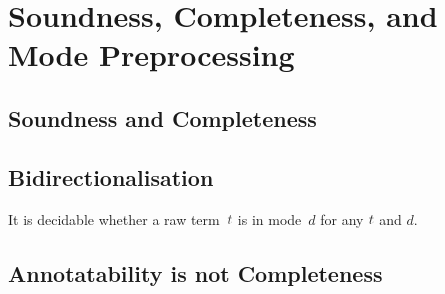 
\section{Soundness, Completeness, and Mode Preprocessing}\label{sec:pre-synthesis}

\subsection{Soundness and Completeness}


\begin{theorem}[Soundness]\label{thm:term-soundness}
    
\end{theorem}

\begin{theorem}[Completeness]\label{thm:term-completeness}
    
\end{theorem}

\begin{theorem}\label{thm:typing-erasure}
    
\end{theorem}

\subsection{Bidirectionalisation}


\begin{proposition} \label{thm:bidirectionalisation}
  It is decidable whether a raw term~$\isTerm{t}$ is in mode~$d$ for any $\isTerm{t}$ and $d$.
\end{proposition}

\subsection{Annotatability is not Completeness}


